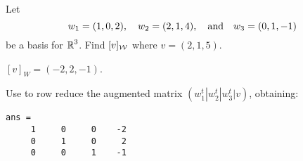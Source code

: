 \documentclass{ximera}
\begin{document}
\begin{exercise} \label{c7.1.6}
Let
\[
w_1=(1,0,2), \quad w_2=(2,1,4), \quad\mbox{and}\quad w_3=(0,1,-1)
\]
be a basis for $\mbox{$\Bbb{R}$}^3$.  Find $[v]_{\cal W}$ where $v=(2,1,5)$.

\begin{solution}

\ans $[v]_W = (-2,2,-1)$.

\soln Use \Matlab to row reduce the augmented matrix
$(w_1^t|w_2^t|w_3^t|v)$, obtaining:
\begin{verbatim}
ans = 
     1     0     0    -2
     0     1     0     2
     0     0     1    -1
\end{verbatim}

\end{solution}
\end{exercise}
\end{document}
